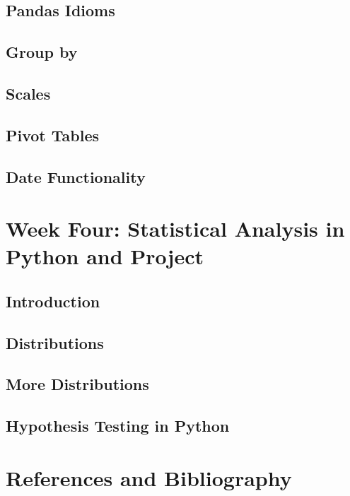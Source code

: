 \documentclass[11pt]{article}
\begin{document}
    \subsection{Pandas Idioms}
    \subsection{Group by}
    \subsection{Scales}
    \subsection{Pivot Tables}
    \subsection{Date Functionality}




\newpage
\section{Week Four: Statistical Analysis in Python and Project}
    \subsection{Introduction}
    \subsection{Distributions}
    \subsection{More Distributions}
    \subsection{Hypothesis Testing in Python}



















\section{References and Bibliography}






\end{document}
